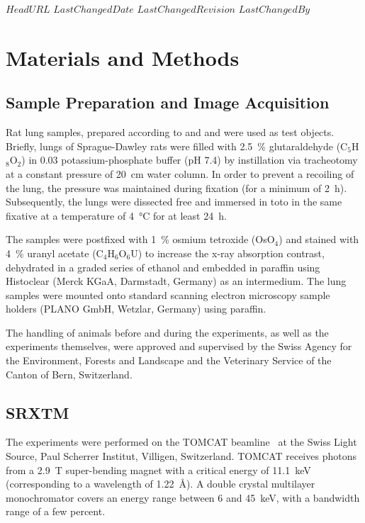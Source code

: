 \svnidlong
{$HeadURL$}
{$LastChangedDate$}
{$LastChangedRevision$}
{$LastChangedBy$}
%
%
\section{Materials and Methods}%
\label{sec:materials and methods}%
\subsection{Sample Preparation and Image Acquisition}%
Rat lung samples, prepared according to %
\ifhtml
	\citet{Tschanz2002} and \citet{Luyet2002}
\else
	 and 
\fi%
were used as test objects. Briefly, lungs of Sprague-Dawley rats were filled with \SI{2.5}{\percent} glutaraldehyde (C$_5$H$_8$O$_2$) in \SI{0.03}{\Molar} potassium-phosphate buffer (pH 7.4) by instillation via tracheotomy at a constant pressure of \SI{20}{\centi\meter} water column. In order to prevent a recoiling of the lung, the pressure was maintained during fixation (for a minimum of \SI{2}{\hour}). Subsequently, the lungs were dissected free and immersed in toto in the same fixative at a temperature of \SI{4}{\celsius} for at least \SI{24}{\hour}.

The samples were postfixed with \SI{1}{\percent} osmium tetroxide (OsO$_4$) and stained with \SI{4}{\percent} uranyl acetate (C$_4$H$_6$O$_6$U) to increase the x-ray absorption contrast, dehydrated in a graded series of ethanol and embedded in paraffin using Histoclear (Merck KGaA, Darmstadt, Germany) as an intermedium. The lung samples were mounted onto standard scanning electron microscopy sample holders (PLANO GmbH, Wetzlar, Germany) using paraffin.

The handling of animals before and during the experiments, as well as the experiments themselves, were approved and supervised by the Swiss Agency for the Environment, Forests and Landscape and the Veterinary Service of the Canton of Bern, Switzerland.

\subsection{SRXTM}%
The experiments were performed on the TOMCAT beamline~\cite{Stampanoni2006a} at the Swiss Light Source, Paul Scherrer Institut, Villigen, Switzerland. TOMCAT receives photons from a \SI{2.9}{\tesla} super-bending magnet with a critical energy of \SI{11.1}{\kilo\electronvolt} (corresponding to a wavelength of \SI{1.22}{\angstrom}). A double crystal multilayer monochromator covers an energy range between 6 and \SI{45}{\kilo\electronvolt}, with a bandwidth range of a few percent.


